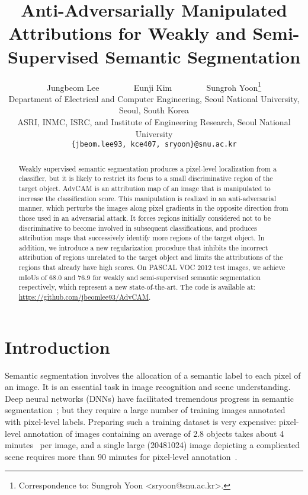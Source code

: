 \documentclass[final]{cvpr}
\begin{document}
\title{Anti-Adversarially Manipulated Attributions for Weakly and Semi-Supervised Semantic Segmentation}


\author{Jungbeom Lee ~~~~~~~ Eunji Kim ~~~~~~~  Sungroh Yoon\thanks{Correspondence to: Sungroh Yoon <sryoon@snu.ac.kr>.}\\
 Department of Electrical and Computer Engineering, Seoul National University, Seoul, South Korea\\
 ASRI, INMC, ISRC, and Institute of Engineering Research, Seoul National University\\
{\tt\small \{jbeom.lee93, kce407, sryoon\}@snu.ac.kr}}



\maketitle


\begin{abstract}
\vspace{-0.3em}
Weakly supervised semantic segmentation produces a pixel-level localization from a classifier, but it is likely to restrict its focus to a small discriminative region of the target object. AdvCAM is an attribution map of an image that is manipulated to increase the classification score. This manipulation is realized in an anti-adversarial manner, which perturbs the images along pixel gradients in the opposite direction from those used in an adversarial attack. It forces regions initially considered not to be discriminative to become involved in subsequent classifications, and produces attribution maps that successively identify more regions of the target object. 
In addition, we introduce a new regularization procedure that inhibits the incorrect attribution of regions unrelated to the target object and limits the attributions of the regions that already have high scores.
On PASCAL VOC 2012 test images, we achieve mIoUs of 68.0 and 76.9 for weakly and semi-supervised semantic segmentation respectively, which represent a new state-of-the-art.
The code is available at: \url{https://github.com/jbeomlee93/AdvCAM}.

\end{abstract}

\vspace{-0.8em}
\section{Introduction}\label{intro}
Semantic segmentation involves the allocation of a semantic label to each pixel of an image.
It is an essential task in image recognition and scene understanding.
Deep neural networks (DNNs) have facilitated tremendous progress in semantic segmentation~\cite{chen2017deeplab, huang2019ccnet}; but they require a large number of training images annotated with pixel-level labels. Preparing such a training dataset is very expensive: pixel-level annotation of images containing an average of 2.8 objects takes about 4 minutes~\cite{bearman2016s} per image, and a single large (20481024) image depicting a complicated scene requires more than 90 minutes for pixel-level annotation~\cite{cordts2016cityscapes}. 
\end{document}
